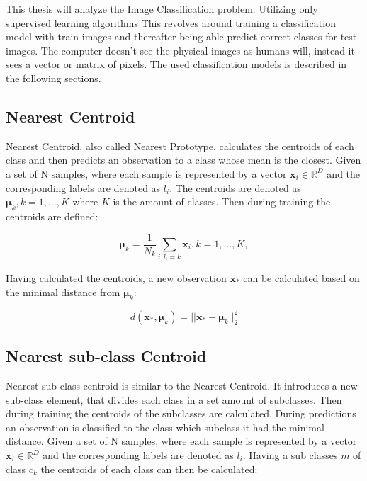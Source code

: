 This thesis will analyze the Image Classification problem. Utilizing only supervised learning algorithms This revolves around training a classification model with train images and thereafter being able predict correct classes for test images. The computer doesn't see the physical images as humans will, instead it sees a vector or matrix of pixels. The used classification models is described in the following sections.     

\subsection{Nearest Centroid}
Nearest Centroid, also called Nearest Prototype, calculates the centroids of each class and then predicts an observation to a class whose mean is the closest. Given a set of N samples, where each sample is represented by a vector $\mathbf{x}_i\in\mathbb{R}^D$ and the corresponding labels are denoted as $l_i$. The centroids are denoted as $\mathbf{\mu}_k, k=1,...,K$ where $K$ is the amount of classes. Then during training the centroids are defined\cite{ai-course-notes}: 

\begin{equation}
    \mathbf{\mu}_k = \frac{1}{N_k} \sum_{i,l_i=k}{\mathbf{x}_i}, k=1,...,K, 
\end{equation}

Having calculated the centroids, a new observation $\mathbf{x}_*$ can be calculated based on the minimal distance from $\mathbf{\mu}_k$: 

\begin{equation}
    d(\mathbf{x}_*, \mathbf{\mu}_k) = ||\mathbf{x}_*-\mathbf{\mu}_k||^2_2
\end{equation}

\subsection{Nearest sub-class Centroid}
Nearest sub-class centroid is similar to the Nearest Centroid. It introduces a new sub-class element, that divides each class in a set amount of subclasses. Then during training the centroids of the subclasses are calculated. During predictions an observation is classified to the class which subclass it had the minimal distance. Given a set of N samples, where each sample is represented by a vector $\mathbf{x}_i\in\mathbb{R}^D$ and the corresponding labels are denoted as $l_i$. Having a sub classes $m$ of class $c_k$ the centroids of each class can then be calculated\cite{ai-course-notes}: 

